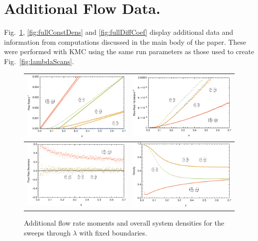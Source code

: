 \documentclass[
reprint, amsmath,amssymb, aps,
 pre, longbibliography,
]{revtex4-1}
\begin{document}
\section{Additional Flow Data.} Fig.~\ref{fig:fullLambdaScans}, \ref{fig:fullConstDens} and \ref{fig:fullDiffCoef} display additional data and information from computations discussed in the main body of the paper. These were performed with KMC using the same run parameters as those used to create Fig.~\ref{fig:lambdaScans}. 
\begin{figure}[h!]
\vspace{1em}
\caption{\label{fig:fullLambdaScans} Additional flow rate moments and overall system densities for the sweeps through $\lambda$ with fixed boundaries.}
\begin{center}
 \begin{tabular}{c|c}
    \includegraphics[width=0.5\linewidth]{newFlowMean} & \includegraphics[width=0.5\linewidth]{newFlowVar} \\
    \hline
    \includegraphics[width=0.5\linewidth]{newFlowSkew} & \includegraphics[width=0.5\linewidth]{newDens} \\
    \end{tabular}
\end{center}
    \vspace{-0em}
\end{figure}
\end{document}
